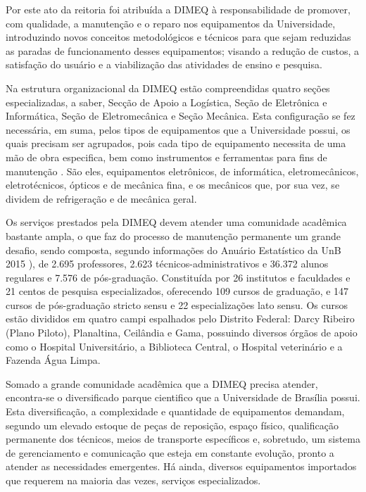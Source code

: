 Por este ato da reitoria foi atribuída a DIMEQ à responsabilidade de promover, com qualidade, a manutenção e o reparo nos equipamentos da Universidade, introduzindo novos conceitos metodológicos e técnicos para que sejam reduzidas as paradas de funcionamento desses equipamentos; visando a redução de custos, a satisfação do usuário e a viabilização das atividades de ensino e pesquisa.

Na estrutura organizacional da DIMEQ estão compreendidas quatro seções especializadas, a saber, Secção de Apoio a Logística, Seção de Eletrônica e Informática, Seção de Eletromecânica e Seção Mecânica. Esta configuração se fez necessária, em suma, pelos tipos de equipamentos que a Universidade possui, os quais precisam ser agrupados, pois cada tipo de equipamento necessita de uma mão de obra especifica, bem como instrumentos e ferramentas para fins de manutenção	. São eles, equipamentos eletrônicos, de informática, eletromecânicos, eletrotécnicos, ópticos e de mecânica fina, e os mecânicos que, por sua vez,  se dividem de refrigeração e de mecânica geral.

Os serviços prestados pela DIMEQ devem atender uma comunidade acadêmica bastante ampla, o que faz do processo de manutenção permanente um grande desafio, sendo composta, segundo informações do Anuário Estatístico da UnB 2015 \cite{anuario2015}), de 2.695 professores, 2.623 técnicos-administrativos e 36.372 alunos regulares e 7.576 de pós-graduação. Constituída por 26 institutos e faculdades e 21 centos de pesquisa especializados, oferecendo 109 cursos de graduação, e 147 cursos de pós-graduação stricto sensu e 22 especializações lato sensu. Os cursos estão divididos em quatro campi espalhados pelo Distrito Federal: Darcy Ribeiro (Plano Piloto), Planaltina, Ceilândia e Gama, possuindo diversos órgãos de apoio como o Hospital Universitário, a Biblioteca Central, o Hospital veterinário e a Fazenda Água Limpa.

Somado a grande comunidade acadêmica que a DIMEQ precisa atender, encontra-se o diversificado parque cientifico que a Universidade de Brasília possui. Esta diversificação, a complexidade e quantidade de equipamentos demandam, segundo \cite{limacastilho2006} um elevado estoque de peças de reposição, espaço físico, qualificação permanente dos técnicos, meios de transporte específicos e, sobretudo, um sistema de gerenciamento e comunicação que esteja em constante evolução, pronto a atender as necessidades emergentes. Há ainda, diversos equipamentos importados que requerem na maioria das vezes, serviços especializados.

